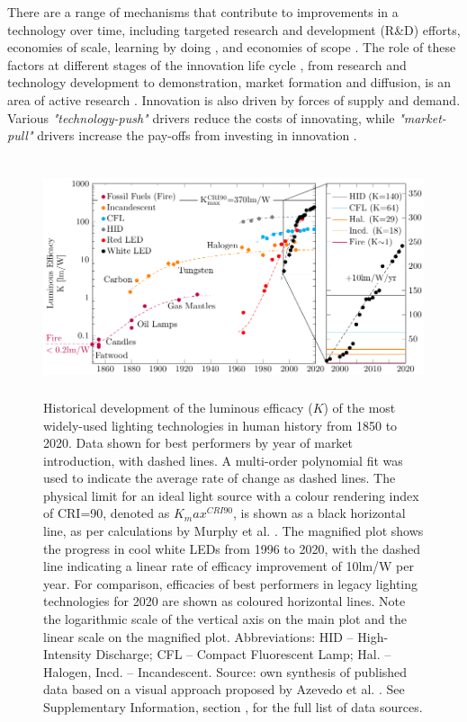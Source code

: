 \documentclass[twoside,twocolumn,9pt]{article}
\begin{document}
There are a range of mechanisms that contribute to improvements in a technology over time, including targeted research and development (R\&D) efforts, economies of scale, learning by doing \cite{Arrow1971}, and economies of scope \cite{johansson2012global}\cite{national2016power}\cite{iea2020perspectives}. The role of these factors at different stages of the innovation life cycle \cite{ grubler2012policies}, from research and technology development to demonstration, market formation and diffusion, is an area of active research \cite{Mowery1979} \cite{kavlak2018evaluating} \cite{Ziegler2021}. Innovation is also driven by forces of supply and demand. Various \textit{"technology-push"} drivers reduce the costs of innovating, while \textit{"market-pull"} drivers increase the pay-offs from investing in innovation \cite{anadon2009policy}.

\begin{figure}[h]
 \centering
 \includegraphics[height=7cm]{2_SSL_EES/article/figures/history_efficacy.pdf}
 \caption{Historical development of the luminous efficacy ($K$) of the most widely-used lighting technologies in human history from 1850 to 2020. Data shown for best performers by year of market introduction, with dashed lines. A multi-order polynomial fit was used to indicate the average rate of change as dashed lines. The physical limit for an ideal light source with a colour rendering index of CRI=90, denoted as $K_max^{CRI90}$, is shown as a black horizontal line, as per calculations by Murphy et al. \cite{Murphy2012}. The magnified plot shows the progress in cool white LEDs from 1996 to 2020, with the dashed line indicating a linear rate of efficacy improvement of 10lm/W per year. For comparison, efficacies of best performers in legacy lighting technologies for 2020 are shown as coloured horizontal lines. Note the logarithmic scale of the vertical axis on the main plot and the linear scale on the magnified plot. Abbreviations: HID – High-Intensity Discharge; CFL – Compact Fluorescent Lamp; Hal. – Halogen, Incd. – Incandescent. Source: own synthesis of published data based on a visual approach proposed by Azevedo et al. \cite{azevedo2009transition}. See Supplementary Information, section , for the full list of data sources. }
 \label{fgr:history_efficacy}
\end{figure}
 
\end{document}
